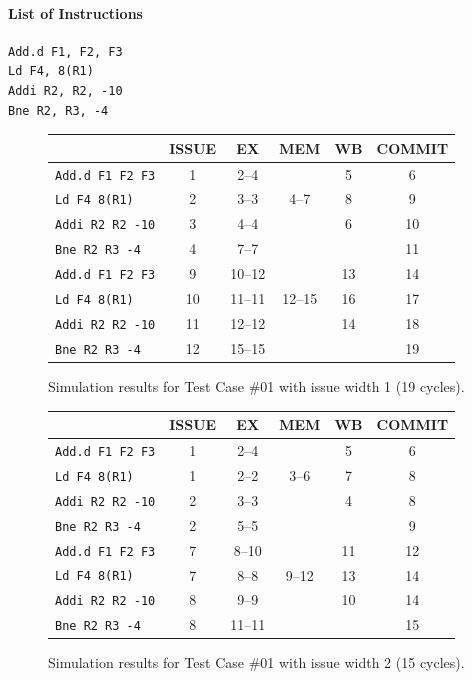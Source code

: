 \documentclass[11pt]{article}
\renewcommand{\_}{\origunderscore\allowbreak}
\begin{document}
\paragraph{List of Instructions}
\begin{verbatim}
Add.d F1, F2, F3
Ld F4, 8(R1)
Addi R2, R2, -10
Bne R2, R3, -4
\end{verbatim}

\begin{figure}[H]
\centering
\small
\begin{tabular}{lccccc}
\hline
 & ISSUE & EX & MEM & WB & COMMIT \\
\hline
\texttt{Add.d F1 F2 F3} & 1 & 2--4 &  & 5 & 6 \\
\texttt{Ld F4 8(R1)} & 2 & 3--3 & 4--7 & 8 & 9 \\
\texttt{Addi R2 R2 -10} & 3 & 4--4 &  & 6 & 10 \\
\texttt{Bne R2 R3 -4} & 4 & 7--7 &  &  & 11 \\
\texttt{Add.d F1 F2 F3} & 9 & 10--12 &  & 13 & 14 \\
\texttt{Ld F4 8(R1)} & 10 & 11--11 & 12--15 & 16 & 17 \\
\texttt{Addi R2 R2 -10} & 11 & 12--12 &  & 14 & 18 \\
\texttt{Bne R2 R3 -4} & 12 & 15--15 &  &  & 19 \\
\hline
\end{tabular}
\caption{Simulation results for Test Case \#01 with issue width 1 (19 cycles).}
\end{figure}

\begin{figure}[H]
\centering
\small
\begin{tabular}{lccccc}
\hline
 & ISSUE & EX & MEM & WB & COMMIT \\
\hline
\texttt{Add.d F1 F2 F3} & 1 & 2--4 &  & 5 & 6 \\
\texttt{Ld F4 8(R1)} & 1 & 2--2 & 3--6 & 7 & 8 \\
\texttt{Addi R2 R2 -10} & 2 & 3--3 &  & 4 & 8 \\
\texttt{Bne R2 R3 -4} & 2 & 5--5 &  &  & 9 \\
\texttt{Add.d F1 F2 F3} & 7 & 8--10 &  & 11 & 12 \\
\texttt{Ld F4 8(R1)} & 7 & 8--8 & 9--12 & 13 & 14 \\
\texttt{Addi R2 R2 -10} & 8 & 9--9 &  & 10 & 14 \\
\texttt{Bne R2 R3 -4} & 8 & 11--11 &  &  & 15 \\
\hline
\end{tabular}
\caption{Simulation results for Test Case \#01 with issue width 2 (15 cycles).}
\end{figure}
\end{document}
